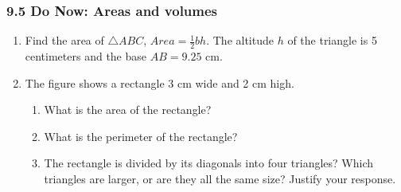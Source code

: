 \documentclass[12pt, twoside]{article}
\begin{document}
\subsubsection*{9.5 Do Now: Areas and volumes}
 \begin{enumerate}


\item Find the area of $\triangle ABC$,  $Area= \frac{1}{2}bh$. The altitude $h$ of the triangle is 5 centimeters and the base $AB=9.25$ cm.\\[1cm]

 \vspace{1.5cm}

\item The figure shows a rectangle 3 cm wide and 2 cm high.
  \begin{center}
  \end{center}
    \begin{enumerate}
      \item What is the area of the rectangle? \vspace{2.5cm}
      \item What is the perimeter of the rectangle? \vspace{2.5cm}
      \item The rectangle is divided by its diagonals into four triangles? Which triangles are larger, or are they all the same size? Justify your response. \vspace{2cm}
    \end{enumerate}

\newpage


\end{enumerate}
\end{document}

